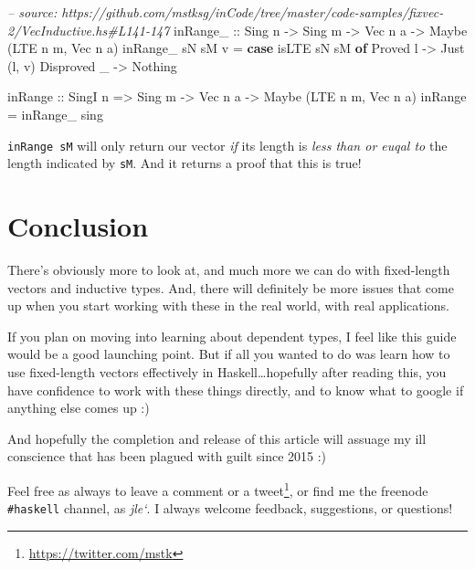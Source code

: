 \documentclass[]{article}
\newenvironment{Shaded}{}{}
\newcommand{\KeywordTok}[1]{\textcolor[rgb]{0.00,0.44,0.13}{\textbf{#1}}}
\newcommand{\DataTypeTok}[1]{\textcolor[rgb]{0.56,0.13,0.00}{#1}}
\newcommand{\CommentTok}[1]{\textcolor[rgb]{0.38,0.63,0.69}{\textit{#1}}}
\newcommand{\OtherTok}[1]{\textcolor[rgb]{0.00,0.44,0.13}{#1}}
\newcommand{\FunctionTok}[1]{\textcolor[rgb]{0.02,0.16,0.49}{#1}}
\newcommand{\NormalTok}[1]{#1}
\renewcommand{\href}[2]{#2\footnote{\url{#1}}}
\begin{document}
\begin{Shaded}
\begin{Highlighting}[]
\CommentTok{-- source: https://github.com/mstksg/inCode/tree/master/code-samples/fixvec-2/VecInductive.hs#L141-147}
\OtherTok{inRange_ ::} \DataTypeTok{Sing}\NormalTok{ n }\OtherTok{->} \DataTypeTok{Sing}\NormalTok{ m }\OtherTok{->} \DataTypeTok{Vec}\NormalTok{ n a }\OtherTok{->} \DataTypeTok{Maybe}\NormalTok{ (}\DataTypeTok{LTE}\NormalTok{ n m, }\DataTypeTok{Vec}\NormalTok{ n a)}
\NormalTok{inRange_ sN sM v }\FunctionTok{=} \KeywordTok{case}\NormalTok{ isLTE sN sM }\KeywordTok{of}
    \DataTypeTok{Proved}\NormalTok{ l    }\OtherTok{->} \DataTypeTok{Just}\NormalTok{ (l, v)}
    \DataTypeTok{Disproved}\NormalTok{ _ }\OtherTok{->} \DataTypeTok{Nothing}

\NormalTok{inRange}\OtherTok{ ::} \DataTypeTok{SingI}\NormalTok{ n }\OtherTok{=>} \DataTypeTok{Sing}\NormalTok{ m }\OtherTok{->} \DataTypeTok{Vec}\NormalTok{ n a }\OtherTok{->} \DataTypeTok{Maybe}\NormalTok{ (}\DataTypeTok{LTE}\NormalTok{ n m, }\DataTypeTok{Vec}\NormalTok{ n a)}
\NormalTok{inRange }\FunctionTok{=}\NormalTok{ inRange_ sing}
\end{Highlighting}
\end{Shaded}

\texttt{inRange\ sM} will only return our vector \emph{if} its length is
\emph{less than or euqal to} the length indicated by \texttt{sM}. And it returns
a proof that this is true!

\section{Conclusion}\label{conclusion}

There's obviously more to look at, and much more we can do with fixed-length
vectors and inductive types. And, there will definitely be more issues that come
up when you start working with these in the real world, with real applications.

If you plan on moving into learning about dependent types, I feel like this
guide would be a good launching point. But if all you wanted to do was learn how
to use fixed-length vectors effectively in Haskell\ldots{}hopefully after
reading this, you have confidence to work with these things directly, and to
know what to google if anything else comes up :)

And hopefully the completion and release of this article will assuage my ill
conscience that has been plagued with guilt since 2015 :)

Feel free as always to leave a comment or a
\href{https://twitter.com/mstk}{tweet}, or find me the freenode
\texttt{\#haskell} channel, as \emph{jle`}. I always welcome feedback,
suggestions, or questions!
\end{document}
